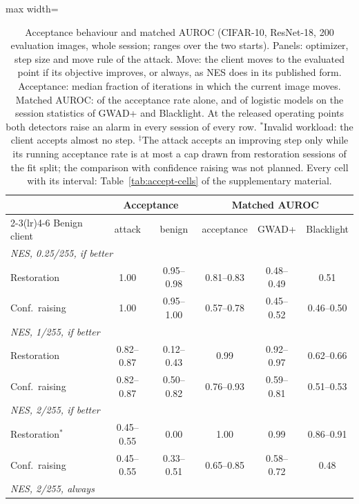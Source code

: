 \begin{table}[!tbp]
\centering\footnotesize\setlength{\tabcolsep}{4pt}
\caption{Acceptance behaviour and matched AUROC (CIFAR-10, ResNet-18, 200 evaluation images, whole session; ranges over the two starts). Panels: optimizer, step size and move rule of the attack. Move: the client moves to the evaluated point if its objective improves, or always, as NES does in its published form. Acceptance: median fraction of iterations in which the current image moves. Matched AUROC: of the acceptance rate alone, and of logistic models on the session statistics of GWAD+ and Blacklight. At the released operating points both detectors raise an alarm in every session of every row. $^{\ast}$Invalid workload: the client accepts almost no step. $^{\ddagger}$The attack accepts an improving step only while its running acceptance rate is at most a cap drawn from restoration sessions of the fit split; the comparison with confidence raising was not planned. Every cell with its interval: Table~\ref{tab:accept-cells} of the supplementary material.}
\label{tab:main-accept}
\vspace{3pt}
\begin{adjustbox}{max width=\textwidth}
\begin{tabular}{lccccc}
\toprule
& \multicolumn{2}{c}{Acceptance} & \multicolumn{3}{c}{Matched AUROC} \\
\cmidrule(lr){2-3}\cmidrule(lr){4-6}
Benign client & attack & benign & acceptance & GWAD+ & Blacklight \\
\midrule
\multicolumn{6}{l}{\emph{NES, 0.25/255, if better}} \\
\quad Restoration & 1.00 & 0.95--0.98 & 0.81--0.83 & 0.48--0.49 & 0.51 \\
\quad Conf.\ raising & 1.00 & 0.95--1.00 & 0.57--0.78 & 0.45--0.52 & 0.46--0.50 \\[2pt]
\multicolumn{6}{l}{\emph{NES, 1/255, if better}} \\
\quad Restoration & 0.82--0.87 & 0.12--0.43 & 0.99 & 0.92--0.97 & 0.62--0.66 \\
\quad Conf.\ raising & 0.82--0.87 & 0.50--0.82 & 0.76--0.93 & 0.59--0.81 & 0.51--0.53 \\[2pt]
\multicolumn{6}{l}{\emph{NES, 2/255, if better}} \\
\quad Restoration$^{\ast}$ & 0.45--0.55 & 0.00 & 1.00 & 0.99 & 0.86--0.91 \\
\quad Conf.\ raising & 0.45--0.55 & 0.33--0.51 & 0.65--0.85 & 0.58--0.72 & 0.48 \\[2pt]
\multicolumn{6}{l}{\emph{NES, 2/255, always}} \\

\end{tabular}
\end{adjustbox}
\end{table}
